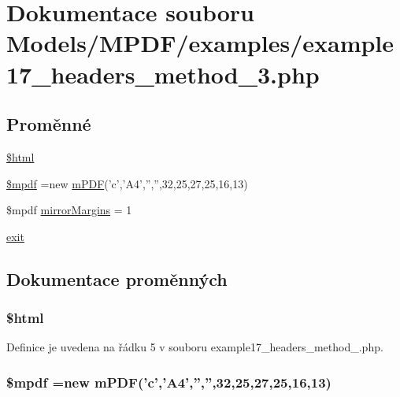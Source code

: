 \hypertarget{example17__headers__method__3_8php}{\section{Dokumentace souboru Models/\-M\-P\-D\-F/examples/example17\-\_\-headers\-\_\-method\-\_\-3.php}
\label{example17__headers__method__3_8php}
}
\subsection*{Proměnné}
\begin{DoxyCompactItemize}
\item 
\hyperlink{example17__headers__method__3_8php_a6f96e7fc92441776c9d1cd3386663b40}{\$html}
\item 
\hyperlink{example17__headers__method__3_8php_ad028f81910d6cbab9b184d2214b3a8f8}{\$mpdf} =new \hyperlink{classm_p_d_f}{m\-P\-D\-F}('c','A4','','',32,25,27,25,16,13)
\item 
\$mpdf \hyperlink{example17__headers__method__3_8php_a24c284cb7774410f65953584ea1fd9c1}{mirror\-Margins} = 1
\item 
\hyperlink{example17__headers__method__3_8php_a6733eb5f605d09eaede9845835d71c4e}{exit}
\end{DoxyCompactItemize}


\subsection{Dokumentace proměnných}
\hypertarget{example17__headers__method__3_8php_a6f96e7fc92441776c9d1cd3386663b40}{
\subsubsection[{\$html}]{\setlength{\rightskip}{0pt plus 5cm}\$html}}\label{example17__headers__method__3_8php_a6f96e7fc92441776c9d1cd3386663b40}


Definice je uvedena na řádku 5 v souboru example17\-\_\-headers\-\_\-method\-\_.\-php.

\hypertarget{example17__headers__method__3_8php_ad028f81910d6cbab9b184d2214b3a8f8}{
\subsubsection[{\$mpdf}]{\setlength{\rightskip}{0pt plus 5cm}\$mpdf =new {\bf m\-P\-D\-F}('c','A4','','',32,25,27,25,16,13)}}\label{example17__headers__method__3_8php_ad028f81910d6cbab9b184d2214b3a8f8}



